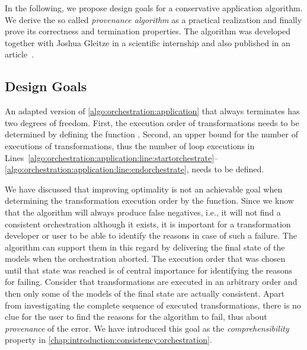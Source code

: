 In the following, we propose design goals for a conservative application algorithm.
We derive the so called \emph{provenance algorithm} as a practical realization and finally prove its correctness and termination properties.
The algorithm was developed together with Joshua Gleitze in a scientific internship and also published in an article~.


\subsection{Design Goals}
\label{chap:orchestration:algorithm:goals}

An adapted version of \autoref{algo:orchestration:application} that always terminates has two degrees of freedom.
First, the execution order of transformations needs to be determined by defining the function .
Second, an upper bound for the number of executions of transformations, thus the number of loop executions in Lines~\ref{algo:orchestration:application:line:startorchestrate}--\ref{algo:orchestration:application:line:endorchestrate}, needs to be defined.

We have discussed that improving optimality is not an achievable goal when determining the transformation execution order by the  function.
Since we know that the algorithm will always produce false negatives, i.e., it will not find a consistent orchestration although it exists, it is important for a transformation developer or user to be able to identify the reasons in case of such a failure.
The algorithm can support them in this regard by delivering the final state of the models when the orchestration aborted.
The execution order that was chosen until that state was reached is of central importance for identifying the reasons for failing.
Consider that transformations are executed in an arbitrary order and then only some of the models of the final state are actually consistent.
Apart from investigating the complete sequence of executed transformations, there is no clue for the user to find the reasons for the algorithm to fail, thus about \emph{provenance} of the error.
We have introduced this goal as the \emph{comprehensibility} property in \autoref{chap:introduction:consistency:orchestration}.

